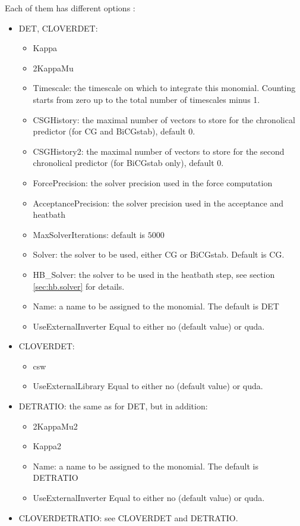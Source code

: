 Each of them has different options
:
\begin{itemize}
\item {\ttfamily DET, CLOVERDET}:
  \begin{itemize}
  \item {\ttfamily Kappa}
  \item {\ttfamily 2KappaMu}
  \item {\ttfamily Timescale}: the timescale on which to integrate
    this monomial. Counting starts from zero up to the total number of
    timescales minus 1.
  \item {\ttfamily CSGHistory}: the maximal number of vectors to store
    for the chronolical predictor (for CG and BiCGstab), default $0$.
  \item {\ttfamily CSGHistory2}: the maximal number of vectors to store
    for the second chronolical predictor (for BiCGstab only), default
    $0$.
  \item {\ttfamily ForcePrecision}: the solver precision used in the
    force computation
  \item {\ttfamily AcceptancePrecision}: the solver precision used in the
    acceptance and heatbath
  \item {\ttfamily MaxSolverIterations}: default is $5000$
  \item {\ttfamily Solver}: the solver to be used, either CG or
    BiCGstab. Default is CG.
  \item {\ttfamily HB\_Solver}: the solver to be used in the heatbath step, see section \ref{sec:hb.solver} for details.
  \item {\ttfamily Name}: a name to be assigned to the monomial. The
    default is {\ttfamily DET}
  \item {\ttfamily UseExternalInverter} 
  Equal to either {\ttfamily no} (default value) or {\ttfamily quda}.
  \end{itemize}
%
\item {\ttfamily CLOVERDET}:
\begin{itemize}
	\item {\ttfamily csw}
	\item {\ttfamily UseExternalLibrary} 
	Equal to either {\ttfamily no} (default value) or {\ttfamily quda}.
\end{itemize}
%
\item {\ttfamily DETRATIO}: the same as for {\ttfamily DET}, but in
  addition:
  \begin{itemize}
  \item {\ttfamily 2KappaMu2}
  \item {\ttfamily Kappa2}
  \item {\ttfamily Name}: 
    a name to be assigned to the monomial. 
    The default is {\ttfamily DETRATIO}
  \item {\ttfamily UseExternalInverter} 
  Equal to either {\ttfamily no} (default value) or {\ttfamily quda}.
  \end{itemize}
%
\item {\ttfamily CLOVERDETRATIO}: 
  see {\ttfamily CLOVERDET} and {\ttfamily DETRATIO}.
 

\end{itemize}
